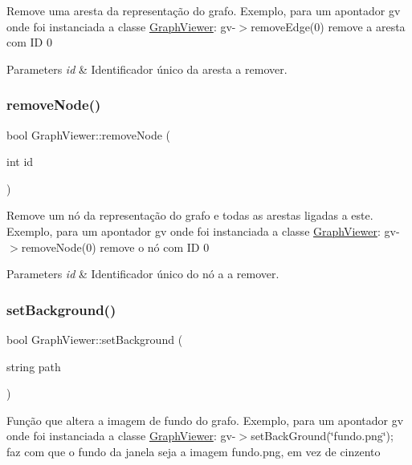 Remove uma aresta da representação do grafo. Exemplo, para um apontador gv onde foi instanciada a classe \mbox{\hyperlink{class_graph_viewer}{Graph\+Viewer}}\+: gv-\/$>$remove\+Edge(0) remove a aresta com ID 0


\begin{DoxyParams}{Parameters}
{\em id} & Identificador único da aresta a remover. \\
\hline
\end{DoxyParams}
\mbox{\label{class_graph_viewer_a0c418639bb911eb827cabf895915f775}} 
\subsubsection{\texorpdfstring{removeNode()}{removeNode()}}
{\footnotesize\ttfamily bool Graph\+Viewer\+::remove\+Node (\begin{DoxyParamCaption}\item[{int}]{id }\end{DoxyParamCaption})}

Remove um nó da representação do grafo e todas as arestas ligadas a este. Exemplo, para um apontador gv onde foi instanciada a classe \mbox{\hyperlink{class_graph_viewer}{Graph\+Viewer}}\+: gv-\/$>$remove\+Node(0) remove o nó com ID 0


\begin{DoxyParams}{Parameters}
{\em id} & Identificador único do nó a a remover. \\
\hline
\end{DoxyParams}
\mbox{\label{class_graph_viewer_a02437b5fecd8b90de24436068312d593}} 
\subsubsection{\texorpdfstring{setBackground()}{setBackground()}}
{\footnotesize\ttfamily bool Graph\+Viewer\+::set\+Background (\begin{DoxyParamCaption}\item[{string}]{path }\end{DoxyParamCaption})}

Função que altera a imagem de fundo do grafo. Exemplo, para um apontador gv onde foi instanciada a classe \mbox{\hyperlink{class_graph_viewer}{Graph\+Viewer}}\+: gv-\/$>$set\+Back\+Ground(\char`\"{}fundo.\+png\char`\"{}); faz com que o fundo da janela seja a imagem fundo.\+png, em vez de cinzento


